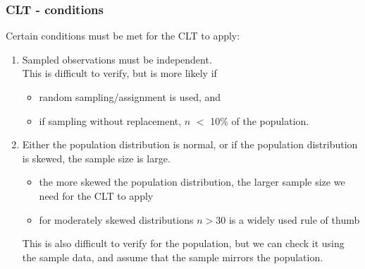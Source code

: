 \begin{frame}
\frametitle{CLT - conditions}

Certain conditions must be met for the CLT to apply:

\begin{enumerate}

\item {} Sampled observations must be independent. \\

This is difficult to verify, but is more likely if
\begin{itemize}
\item random sampling/assignment is used, and
\item if sampling without replacement, $n$ $<$ 10\% of the population.
\end{itemize}

\pause

\item {} Either the population distribution is normal, or if the population distribution is skewed, the sample size is large.\\
\begin{itemize}
\item the more skewed the population distribution, the larger sample size we need for the CLT to apply
\item for moderately skewed distributions $n>30$ is a widely used rule of thumb \\
\end{itemize}

This is also difficult to verify for the population, but we can check it using the sample data, and assume that the sample mirrors the population.

\end{enumerate}

\end{frame}


